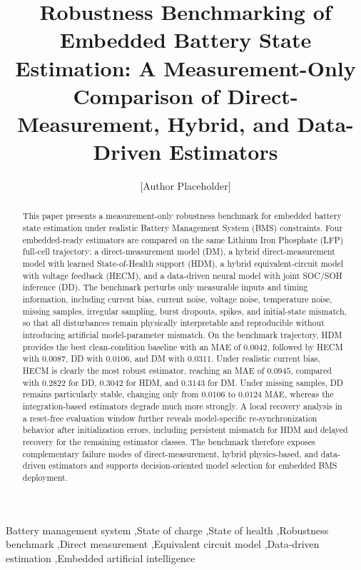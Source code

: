 \documentclass[review,nopreprintline]{elsarticle}
\date{}
\begin{document}
\linenumbers
\begin{frontmatter}
\title{Robustness Benchmarking of Embedded Battery State Estimation: A Measurement-Only Comparison of Direct-Measurement, Hybrid, and Data-Driven Estimators}
\author[1]{[Author Placeholder]}
\begin{abstract}
This paper presents a measurement-only robustness benchmark for embedded battery state estimation under realistic Battery Management System (BMS) constraints. Four embedded-ready estimators are compared on the same Lithium Iron Phosphate (LFP) full-cell trajectory: a direct-measurement model (DM), a hybrid direct-measurement model with learned State-of-Health support (HDM), a hybrid equivalent-circuit model with voltage feedback (HECM), and a data-driven neural model with joint SOC/SOH inference (DD). The benchmark perturbs only measurable inputs and timing information, including current bias, current noise, voltage noise, temperature noise, missing samples, irregular sampling, burst dropouts, spikes, and initial-state mismatch, so that all disturbances remain physically interpretable and reproducible without introducing artificial model-parameter mismatch. On the benchmark trajectory, HDM provides the best clean-condition baseline with an MAE of $0.0042$, followed by HECM with $0.0087$, DD with $0.0106$, and DM with $0.0311$. Under realistic current bias, HECM is clearly the most robust estimator, reaching an MAE of $0.0945$, compared with $0.2822$ for DD, $0.3042$ for HDM, and $0.3143$ for DM. Under missing samples, DD remains particularly stable, changing only from $0.0106$ to $0.0124$ MAE, whereas the integration-based estimators degrade much more strongly. A local recovery analysis in a reset-free evaluation window further reveals model-specific re-synchronization behavior after initialization errors, including persistent mismatch for HDM and delayed recovery for the remaining estimator classes. The benchmark therefore exposes complementary failure modes of direct-measurement, hybrid physics-based, and data-driven estimators and supports decision-oriented model selection for embedded BMS deployment.
\end{abstract}
\begin{keyword}
Battery management system \sep State of charge \sep State of health \sep Robustness benchmark \sep Direct measurement \sep Equivalent circuit model \sep Data-driven estimation \sep Embedded artificial intelligence
\end{keyword}
\end{frontmatter}
\end{document}
